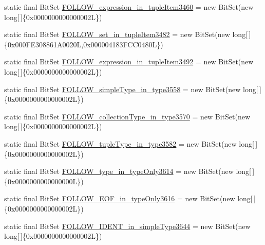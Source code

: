 \begin{DoxyCompactItemize}
static final Bit\-Set \hyperlink{classorg_1_1tzi_1_1use_1_1parser_1_1testsuite_1_1_test_suite_parser_ae1d660ac49efa82f368b3aa2538f7c6a}{F\-O\-L\-L\-O\-W\-\_\-expression\-\_\-in\-\_\-tuple\-Item3460} = new Bit\-Set(new long\mbox{[}$\,$\mbox{]}\{0x0000000000000002\-L\})
\item 
static final Bit\-Set \hyperlink{classorg_1_1tzi_1_1use_1_1parser_1_1testsuite_1_1_test_suite_parser_a7dbcb17ab14e7e472113f9a11dfbb2ac}{F\-O\-L\-L\-O\-W\-\_\-set\-\_\-in\-\_\-tuple\-Item3482} = new Bit\-Set(new long\mbox{[}$\,$\mbox{]}\{0x000\-F\-E308861\-A0020\-L,0x000004183\-F\-C\-C0480\-L\})
\item 
static final Bit\-Set \hyperlink{classorg_1_1tzi_1_1use_1_1parser_1_1testsuite_1_1_test_suite_parser_a3df89dd6ab311d1bd16056304746a465}{F\-O\-L\-L\-O\-W\-\_\-expression\-\_\-in\-\_\-tuple\-Item3492} = new Bit\-Set(new long\mbox{[}$\,$\mbox{]}\{0x0000000000000002\-L\})
\item 
static final Bit\-Set \hyperlink{classorg_1_1tzi_1_1use_1_1parser_1_1testsuite_1_1_test_suite_parser_a0db84ccb113f25d614b00ffe55d592d0}{F\-O\-L\-L\-O\-W\-\_\-simple\-Type\-\_\-in\-\_\-type3558} = new Bit\-Set(new long\mbox{[}$\,$\mbox{]}\{0x0000000000000002\-L\})
\item 
static final Bit\-Set \hyperlink{classorg_1_1tzi_1_1use_1_1parser_1_1testsuite_1_1_test_suite_parser_a95a117a9d874571316130d17c7e4c460}{F\-O\-L\-L\-O\-W\-\_\-collection\-Type\-\_\-in\-\_\-type3570} = new Bit\-Set(new long\mbox{[}$\,$\mbox{]}\{0x0000000000000002\-L\})
\item 
static final Bit\-Set \hyperlink{classorg_1_1tzi_1_1use_1_1parser_1_1testsuite_1_1_test_suite_parser_a1a2301c573cb31a8aa4dd8ec20084b65}{F\-O\-L\-L\-O\-W\-\_\-tuple\-Type\-\_\-in\-\_\-type3582} = new Bit\-Set(new long\mbox{[}$\,$\mbox{]}\{0x0000000000000002\-L\})
\item 
static final Bit\-Set \hyperlink{classorg_1_1tzi_1_1use_1_1parser_1_1testsuite_1_1_test_suite_parser_a2f642d86f4e82cc3dd1b859dced6db2a}{F\-O\-L\-L\-O\-W\-\_\-type\-\_\-in\-\_\-type\-Only3614} = new Bit\-Set(new long\mbox{[}$\,$\mbox{]}\{0x0000000000000000\-L\})
\item 
static final Bit\-Set \hyperlink{classorg_1_1tzi_1_1use_1_1parser_1_1testsuite_1_1_test_suite_parser_a8b4838802d5b4e61b23549f4ab1e568f}{F\-O\-L\-L\-O\-W\-\_\-\-E\-O\-F\-\_\-in\-\_\-type\-Only3616} = new Bit\-Set(new long\mbox{[}$\,$\mbox{]}\{0x0000000000000002\-L\})
\item 
static final Bit\-Set \hyperlink{classorg_1_1tzi_1_1use_1_1parser_1_1testsuite_1_1_test_suite_parser_afd99a09d5519153521f96541ab07f4c4}{F\-O\-L\-L\-O\-W\-\_\-\-I\-D\-E\-N\-T\-\_\-in\-\_\-simple\-Type3644} = new Bit\-Set(new long\mbox{[}$\,$\mbox{]}\{0x0000000000000002\-L\})

\end{DoxyCompactItemize}
